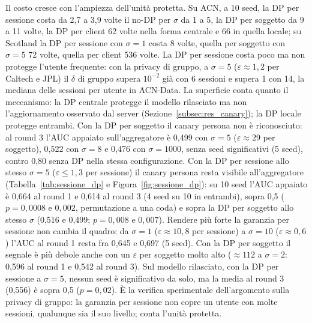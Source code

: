 Il costo cresce con l'ampiezza dell'unità protetta. Su ACN, a 10 seed, la DP per sessione costa da 2,7 a
3,9 volte il no-DP per $\sigma$ da 1 a 5, la DP per soggetto da 9 a 11 volte, la DP per
client 62 volte nella forma centrale e 66 in quella locale; su Scotland la DP per sessione con
$\sigma=1$ costa 8 volte, quella per soggetto con $\sigma=5$ 72 volte, quella per client 536
volte. La DP per sessione costa poco ma non
protegge l'utente frequente: con la privacy di gruppo, a $\sigma=5$ ($\varepsilon\approx1{,}2$
per Caltech e JPL) il $\delta$ di gruppo supera $10^{-2}$ già con 6 sessioni e supera 1 con 14,
la mediana delle sessioni per utente in ACN-Data. La superficie conta quanto il meccanismo:
la DP centrale protegge il modello rilasciato ma non l'aggiornamento osservato dal server
(Sezione~\ref{subsec:res_canary}); la DP locale protegge entrambi. Con la DP per soggetto il canary persona non è
riconosciuto: al round 3 l'AUC appaiato sull'aggregatore è 0,499 con $\sigma=5$ ($\varepsilon\approx29$
per soggetto), 0,522 con $\sigma=8$ e 0,476 con $\sigma=1000$, senza seed significativi (5 seed), contro
0,80 senza DP nella stessa configurazione. Con la DP per sessione allo stesso $\sigma=5$
($\varepsilon\le1{,}3$ per sessione) il canary persona resta visibile all'aggregatore
(Tabella~\ref{tab:sessione_dp} e Figura~\ref{fig:sessione_dp}): su 10 seed l'AUC appaiato è 0,664
al round 1 e 0,614 al round 3 (4 seed su 10 in entrambi), sopra 0,5 ($p=0{,}0008$ e $0{,}002$,
permutazione a una coda) e sopra la DP per soggetto allo stesso $\sigma$ (0,516 e 0,499;
$p=0{,}008$ e $0{,}007$). Rendere più forte la garanzia per sessione non cambia il quadro: da
$\sigma=1$ ($\varepsilon\approx10{,}8$ per sessione) a $\sigma=10$ ($\varepsilon\approx0{,}6$)
l'AUC al round 1 resta fra 0,645 e 0,697 (5 seed). Con la DP per soggetto il segnale è più debole
anche con un $\varepsilon$ per soggetto molto alto ($\approx112$ a $\sigma=2$: 0,596 al round 1 e
0,542 al round 3). Sul modello rilasciato, con la DP per sessione a $\sigma=5$, nessun seed è
significativo da solo, ma la media al round 3 (0,556) è sopra 0,5 ($p=0{,}02$). È la verifica
sperimentale dell'argomento sulla privacy di gruppo: la garanzia per sessione non copre un utente
con molte sessioni, qualunque sia il suo livello; conta l'unità protetta.

